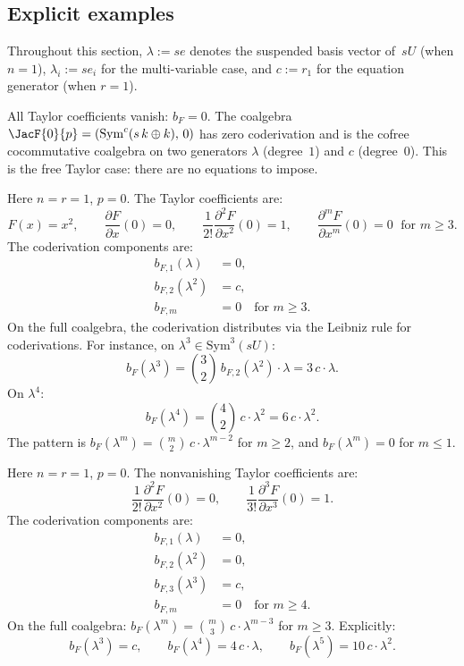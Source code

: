 \subsection{Explicit examples}\label{subsec:jacobi-examples}

Throughout this section, $\lambda := se$ denotes the suspended basis vector
of~$sU$ (when $n = 1$), $\lambda_i := se_i$ for the multi-variable
case, and $c := r_1$ for the equation generator (when $r = 1$).

\begin{example}[Free case: $F(x) = 0$]
\label{ex:jacobi-free}
All Taylor coefficients vanish: $b_F = 0$. The coalgebra
$\JacF{0}{p} = (\mathrm{Sym}^c(s\,k \oplus k),\, 0)$ has zero
coderivation and is the cofree cocommutative coalgebra on two
generators $\lambda$ (degree~$1$) and $c$ (degree~$0$). This is the
free Taylor case: there are no equations to impose.
\end{example}

\begin{example}[Node: $F(x) = x^2$, one variable]
\label{ex:jacobi-node}
Here $n = r = 1$, $p = 0$. The Taylor coefficients are:
\[
F(x) = x^2, \qquad
\frac{\partial F}{\partial x}(0) = 0, \qquad
\frac{1}{2!}\frac{\partial^2 F}{\partial x^2}(0) = 1, \qquad
\frac{\partial^m F}{\partial x^m}(0) = 0 \;\text{ for } m \geq 3.
\]
The coderivation components are:
\begin{align*}
b_{F,1}(\lambda) &= 0, \\
b_{F,2}(\lambda^2) &= c, \\
b_{F,m} &= 0 \quad\text{for } m \geq 3.
\end{align*}
On the full coalgebra, the coderivation distributes via the Leibniz
rule for coderivations. For instance, on $\lambda^3 \in \mathrm{Sym}^3(sU)$:
\[
b_F(\lambda^3)
= \binom{3}{2}\, b_{F,2}(\lambda^2) \cdot \lambda
= 3\, c \cdot \lambda.
\]
On $\lambda^4$:
\[
b_F(\lambda^4)
= \binom{4}{2}\, c \cdot \lambda^2
= 6\, c \cdot \lambda^2.
\]
The pattern is $b_F(\lambda^m) = \binom{m}{2}\, c \cdot \lambda^{m-2}$
for $m \geq 2$, and $b_F(\lambda^m) = 0$ for $m \leq 1$.
\end{example}

\begin{example}[Cusp: $F(x) = x^3$, one variable]
\label{ex:jacobi-cusp}
Here $n = r = 1$, $p = 0$. The nonvanishing Taylor coefficients are:
\[
\frac{1}{2!}\frac{\partial^2 F}{\partial x^2}(0) = 0, \qquad
\frac{1}{3!}\frac{\partial^3 F}{\partial x^3}(0) = 1.
\]
The coderivation components are:
\begin{align*}
b_{F,1}(\lambda) &= 0, \\
b_{F,2}(\lambda^2) &= 0, \\
b_{F,3}(\lambda^3) &= c, \\
b_{F,m} &= 0 \quad\text{for } m \geq 4.
\end{align*}
On the full coalgebra:
$b_F(\lambda^m) = \binom{m}{3}\, c \cdot \lambda^{m-3}$ for $m \geq 3$.
Explicitly:
\[
b_F(\lambda^3) = c, \qquad
b_F(\lambda^4) = 4\, c \cdot \lambda, \qquad
b_F(\lambda^5) = 10\, c \cdot \lambda^2.
\]
\end{example}

